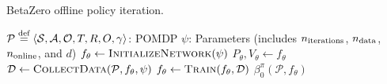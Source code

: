 \begin{algorithm}[H]
    \small
    \caption{BetaZero offline policy iteration.}
    \label{alg:betazero}
    \begin{algorithmic}[1]
        \Require $\mathcal{P} \stackrel{\text{def}}{=} \langle \mathcal{S}, \mathcal{A}, \mathcal{O}, T, R, O, \gamma \rangle$: POMDP
        \Require $\psi$: Parameters (includes $n_{\text{\rm iterations}}$, $n_{\text{\rm data}}$, $n_{\text{\rm online}}$, and $d$)
            \State $f_\theta \leftarrow \textproc{InitializeNetwork}(\psi)$
            \State $P_\theta, V_\theta \leftarrow f_\theta$ 
                \State $\mathcal{D} \leftarrow \textproc{CollectData}(\mathcal{P}, f_\theta, \psi)$ 
                \State $f_\theta \leftarrow \textproc{Train}(f_\theta, \mathcal{D})$ 
            \EndFor
            \State \Return $\beta_0^\pi(\mathcal{P}, f_\theta)$ 
        \EndFunction
    \end{algorithmic}
\end{algorithm}
